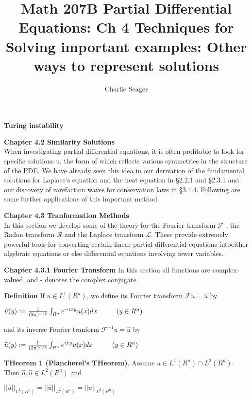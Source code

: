 \documentclass{article}
\newcommand\tab[1][1cm]{\hspace*{#1}}
\begin{document}
\title {Math 207B Partial Differential Equations: Ch 4 Techniques for Solving important examples: Other ways to represent solutions}

\author{Charlie Seager}

\maketitle

\textbf {Turing instability}

\textbf {Chapter 4.2 Similarity Solutions} \\
When investigating partial differential equations, it is often profitable to
look for specific solutions u, the form of which reflects various symmetries
in the structure of the PDE. We have already seen this idea in our derivation
of the fundamental solutions for Laplace's equation and the heat equation
in §2.2.1 and §2.3.1 and our discovery of rarefaction waves for conservation
laws in §3.4.4. Following are some further applications of this important
method.

\textbf {Chapter 4.3 Tranformation Methods} \\
In this section we develop some of the theory for the Fourier transform $\mathcal{F}$ , the Radon transform $\mathcal{R}$ and the Laplace transform $\mathcal{L}$. These provide extremely powerful tools for converting certain linear partial differential equations intoeither algebraic equations or else differential equations involving fewer
variables.

\textbf {Chapter 4.3.1 Fourier Transform} In this section all functions are complex-valued, and - denotes the complex conjugate

\textbf {Definition} If $u \in L^1 (R^n)$, we define its Fourier transform $\mathcal{F} u = \hat{u}$ by 
\begin{center}
$\hat{u}(y) := \frac{1}{(2\pi)^{n/2}} \int_{R^n} e^{-ixy}u(x) dx \tab (y \in R^n)$
\end{center}
and its inverse Fourier tranform $\mathcal{F}^{-1} u = \hat{u}$ by 
\begin{center}
$\widehat{u}(y) := \frac{1}{(2\pi)^{n/2}} \int_{R^n} e^{ixy} u(x) dx \tab (y \in R^n)$
\end{center}

\textbf {THeorem 1 (Plancherel's THeorem)}. Assume $u \in L^1 (R^n) \cap L^2(R^n)$. Then $\hat{u}, \widehat{u} \in L^2(R^n)$ and
\begin{center}
$||\hat{u}||_{L^2(R^n)} = ||\widehat{u}||_{L^2(R^n)} = ||u||_{L^2(R^n)}$
\end{center}
\end{document}
